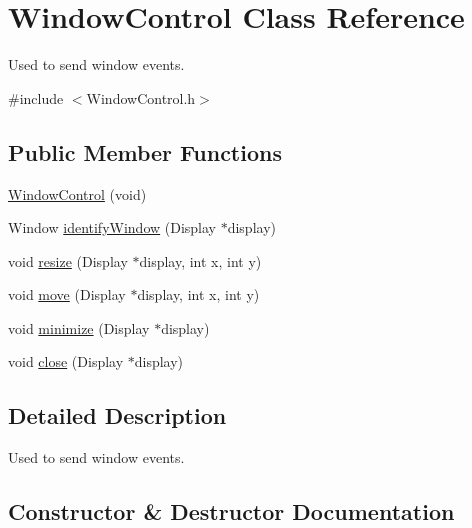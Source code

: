 \hypertarget{classWindowControl}{}\section{Window\+Control Class Reference}
\label{classWindowControl}


Used to send window events.  




{\ttfamily \#include $<$Window\+Control.\+h$>$}

\subsection*{Public Member Functions}
\begin{DoxyCompactItemize}
\item 
\hyperlink{classWindowControl_ac1737a56defaa8f60f53054b2167fee8}{Window\+Control} (void)
\item 
Window \hyperlink{classWindowControl_aad092a22b19664df4d94fe9a853d350a}{identify\+Window} (Display $\ast$display)
\item 
void \hyperlink{classWindowControl_a131a982c3338be4187ac6611591e042f}{resize} (Display $\ast$display, int x, int y)
\item 
void \hyperlink{classWindowControl_a367c48d4f217a83225c8ade45e347884}{move} (Display $\ast$display, int x, int y)
\item 
void \hyperlink{classWindowControl_abb8d0ae3c43be976259181c848fa4568}{minimize} (Display $\ast$display)
\item 
void \hyperlink{classWindowControl_a2f521062be8be113d1cbcca4f495d693}{close} (Display $\ast$display)
\end{DoxyCompactItemize}


\subsection{Detailed Description}
Used to send window events. 

\subsection{Constructor \& Destructor Documentation}
\mbox{\label{classWindowControl_ac1737a56defaa8f60f53054b2167fee8}} 
